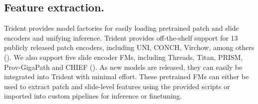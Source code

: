 \subsection{Feature extraction.}
Trident provides model factories for easily loading pretrained patch and slide encoders and unifying inference. Trident provides off-the-shelf support for 13 publicly released patch encoders, including UNI\cite{chen2024towards}, CONCH\cite{luVisuallanguageFoundationModel2024}, Virchow\cite{vorontsov2024foundation}, among others (). We also support five slide encoder FMs, including Threads\cite{vaidya2024amolecular}, Titan\cite{ding2024titan}, PRISM\cite{shaikovski2024prism}, Prov-GigaPath\cite{xu2024whole} and CHIEF\cite{wang2024chief} (). As new models are released, they can easily be integrated into Trident with minimal effort. These pretrained FMs can either be used to extract patch and slide-level features using the provided scripts or imported into custom pipelines for inference or finetuning.


